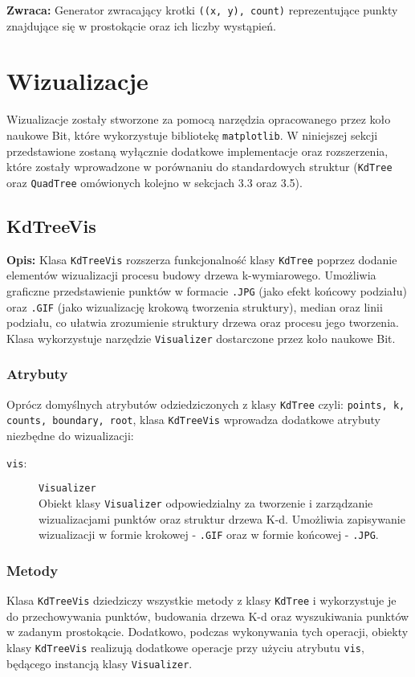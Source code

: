 \documentclass[12pt]{article}
\begin{document}
\textbf{Zwraca:} 
Generator zwracający krotki \texttt{((x, y), count)} reprezentujące punkty znajdujące się w prostokącie oraz ich liczby wystąpień.

\section{Wizualizacje}

Wizualizacje zostały stworzone za pomocą narzędzia opracowanego przez koło naukowe Bit, które wykorzystuje bibliotekę \texttt{matplotlib}. W niniejszej sekcji przedstawione zostaną wyłącznie dodatkowe implementacje oraz rozszerzenia, które zostały wprowadzone w porównaniu do standardowych struktur (\texttt{KdTree} oraz \texttt{QuadTree} omówionych kolejno w sekcjach 3.3 oraz 3.5).

\subsection{KdTreeVis}

\textbf{Opis:} Klasa \texttt{KdTreeVis} rozszerza funkcjonalność klasy \texttt{KdTree} poprzez dodanie elementów wizualizacji procesu budowy drzewa k-wymiarowego. Umożliwia graficzne przedstawienie punktów w formacie \texttt{.JPG} (jako efekt końcowy podziału) oraz \texttt{.GIF} (jako wizualizację krokową tworzenia struktury), median oraz linii podziału, co ułatwia zrozumienie struktury drzewa oraz procesu jego tworzenia. Klasa wykorzystuje narzędzie \texttt{Visualizer} dostarczone przez koło naukowe Bit.


\subsubsection{Atrybuty}
Oprócz domyślnych atrybutów odziedziczonych z klasy \texttt{KdTree} czyli: \texttt{points, k, counts, boundary, root}, klasa \texttt{KdTreeVis} wprowadza dodatkowe atrybuty niezbędne do wizualizacji:
\begin{description}
    \item[\texttt{vis}:] \texttt{Visualizer} \\
    Obiekt klasy \texttt{Visualizer} odpowiedzialny za tworzenie i zarządzanie wizualizacjami punktów oraz struktur drzewa K-d. Umożliwia zapisywanie wizualizacji w formie krokowej - \texttt{.GIF} oraz w formie końcowej - \texttt{.JPG}.
\end{description}

\subsubsection{Metody}
Klasa \texttt{KdTreeVis} dziedziczy wszystkie metody z klasy \texttt{KdTree} i wykorzystuje je do przechowywania punktów, budowania drzewa K-d oraz wyszukiwania punktów w zadanym prostokącie. Dodatkowo, podczas wykonywania tych operacji, obiekty klasy \texttt{KdTreeVis} realizują dodatkowe operacje przy użyciu atrybutu \texttt{vis}, będącego instancją klasy \texttt{Visualizer}.
\end{document}
